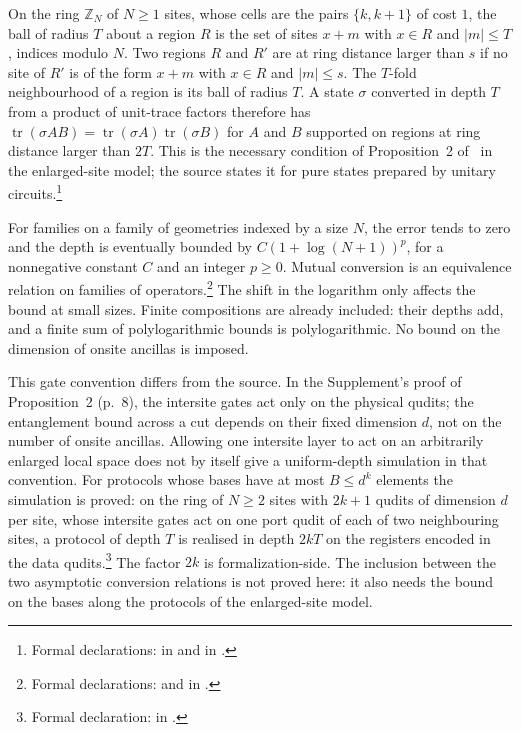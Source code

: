 \documentclass{article}
\begin{document}
On the ring $\mathbb Z_N$ of $N\ge1$ sites, whose cells are the pairs $\{k,k+1\}$ of
cost $1$, the ball of radius $T$ about a region $R$ is the set of sites $x+m$ with $x\in R$
and $\lvert m\rvert\le T$, indices modulo $N$. Two regions $R$ and $R'$ are at ring distance
larger than $s$ if no site of $R'$ is of the form $x+m$ with $x\in R$ and
$\lvert m\rvert\le s$. The $T$-fold neighbourhood of a region is its ball of radius $T$.
A state $\sigma$ converted in depth $T$ from a product of unit-trace factors therefore has
$\operatorname{tr}(\sigma AB)=\operatorname{tr}(\sigma A)\operatorname{tr}(\sigma B)$
for $A$ and $B$ supported on regions at ring distance larger than $2T$. This is the
necessary condition of Proposition~2 of~\cite{Piroli2021LOCC} in the enlarged-site
model; the source states it for pure states prepared by unitary circuits.\footnote{Formal
    declarations:  in
     and
     in
    .}

For families on a family of geometries indexed by a size $N$, the error tends
to zero and the depth is eventually bounded by $C(1+\log(N+1))^p$, for a
nonnegative constant $C$ and an integer $p\ge0$. Mutual conversion is an
equivalence relation on families of operators.\footnote{Formal declarations:
     and
     in
    .}
The shift in the logarithm only affects the bound at small sizes. Finite
compositions are already included: their depths add, and a finite sum of
polylogarithmic bounds is polylogarithmic. No bound on the dimension of
onsite ancillas is imposed.

This gate convention differs from the source. In the Supplement's proof of
Proposition~2 (p.~8), the intersite gates act only on the physical qudits;
the entanglement bound across a cut depends on their fixed dimension $d$,
not on the number of onsite ancillas. Allowing one intersite layer to act
on an arbitrarily enlarged local space does not by itself give a
uniform-depth simulation in that convention. For protocols whose bases have
at most $B\le d^k$ elements the simulation is proved: on the ring of $N\ge2$
sites with $2k+1$ qudits of dimension $d$ per site, whose intersite gates act
on one port qudit of each of two neighbouring sites, a protocol of depth $T$
is realised in depth $2kT$ on the registers encoded in the data
qudits.\footnote{Formal declaration:
     in
    .} The factor $2k$ is
formalization-side. The inclusion between the two asymptotic conversion
relations is not proved here: it also needs the bound on the bases along the
protocols of the enlarged-site model.
\end{document}
